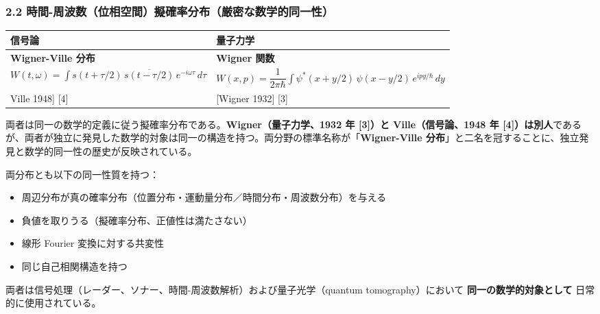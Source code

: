 \documentclass[
]{ltjsarticle}
\newcounter{none} %
\providecommand{\tightlist}{%
  \setlength{\itemsep}{0pt}\setlength{\parskip}{0pt}}
\begin{document}
\subsubsection{2.2
時間-周波数（位相空間）擬確率分布（厳密な数学的同一性）}\label{ux6642ux9593-ux5468ux6ce2ux6570ux4f4dux76f8ux7a7aux9593ux64ecux78baux7387ux5206ux5e03ux53b3ux5bc6ux306aux6570ux5b66ux7684ux540cux4e00ux6027}

{\def\LTcaptype{none} %
\begin{longtable}[]{@{}
  >{\raggedright\arraybackslash}p{}
  >{\raggedright\arraybackslash}p{}@{}}
\toprule\noalign{}
\begin{minipage}[b]{\linewidth}\raggedright
信号論
\end{minipage} & \begin{minipage}[b]{\linewidth}\raggedright
量子力学
\end{minipage} \\
\midrule\noalign{}
\endhead
\bottomrule\noalign{}
\endlastfoot
\textbf{Wigner-Ville 分布} & \textbf{Wigner 関数} \\
\(W(t,\omega) = \int s(t+\tau/2)\,\overline{s(t-\tau/2)}\, e^{-i\omega\tau}\, d\tau\)
&
\(W(x,p) = \dfrac{1}{2\pi\hbar}\int \psi^*(x+y/2)\,\psi(x-y/2)\, e^{ipy/\hbar}\, dy\) \\
{[}Ville 1948{]} {[}4{]} & {[}Wigner 1932{]} {[}3{]} \\
\end{longtable}
}

両者は同一の数学的定義に従う擬確率分布である。\textbf{Wigner（量子力学、1932
年 {[}3{]}）と Ville（信号論、1948 年
{[}4{]}）は別人}であるが、両者が独立に発見した数学的対象は同一の構造を持つ。両分野の標準名称が「\textbf{Wigner-Ville
分布}」と二名を冠することに、独立発見と数学的同一性の歴史が反映されている。

両分布とも以下の同一性質を持つ：

\begin{itemize}
\tightlist
\item
  周辺分布が真の確率分布（位置分布・運動量分布／時間分布・周波数分布）を与える
\item
  負値を取りうる（擬確率分布、正値性は満たさない）
\item
  線形 Fourier 変換に対する共変性
\item
  同じ自己相関構造を持つ
\end{itemize}

両者は信号処理（レーダー、ソナー、時間-周波数解析）および量子光学（quantum
tomography）において \textbf{同一の数学的対象として}
日常的に使用されている。
\end{document}
